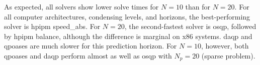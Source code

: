 As expected, all solvers show lower solve times for $N=10$ than for $N=20$. For all computer architectures, condensing levels, and horizons, the best-performing solver is \gls{hpipm} speed\_abs. 
For $N=20$, the second-fastest solver is \acrshort{osqp}, followed by \gls{hpipm} balance, although the difference is marginal on x86 systems.
\acrshort{daqp} and \acrshort{qpoases} are much slower for this prediction horizon.
For $N=10$, however, both \acrshort{qpoases} and \acrshort{daqp} perform almost as well as \acrshort{osqp} with $N_p=20$ (sparse problem).
